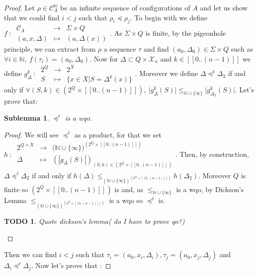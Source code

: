 \documentclass[a4paper,10pt]{report}
\newtheorem{slm}{Sublemma}[lm]
\newtheorem{td}{TODO}
\newcommand{\dmap}[5]{
#1~:~\begin{array}{ccccc}
#2 &\to& #3 \\
#4  &\mapsto& #5
\end{array}}
\newcommand{\seg}[1]{[\![#1]\!]}
\newcommand{\ts}{\seg{0 .. (n-1)}}
\newcommand{\C}{\mathcal{C}_{A}}
\newcommand{\X}{\mathcal{X}_{n}}
\begin{document}
\begin {proof}
Let $\rho \in \C^{\mathbb N}$ be an infinite sequence of configurations of $A$ and let us show that we could find $i < j$ such that $\rho_i \preceq \rho_j$.
To begin with we define
$\dmap{f}{\C}{\Sigma \times Q}{(a,x,\Delta)}{(a,\Delta(x))}$.
As $\Sigma \times Q$ is finite, by the pigeonhole principle, we can extract from $\rho$ a sequence $\tau$ and find $(a_0,\Delta_0) \in \Sigma \times Q$ such as 
$\forall i \in \mathbb N,\ f(\tau_i)=(a_0,\Delta_0)$.
Now for $\Delta \subset Q \times \X $ and $k \in \ts$ we define $\dmap{g^k_\Delta}{2^Q}{2^X}{S}{\{ x \in X | S=\Delta^k(x) \}} .$
Moreover we define $\Delta \preceq^t \Delta_2$ if and only if $\forall (S,k) \in (2^Q \times \ts) ,\ \lvert g^k_\Delta(S) \lvert \leq_{\mathbb N \cup \{\infty\}} \lvert g^k_{\Delta_2}(S) \lvert$. Let's prove that: 
\begin{slm}
  $\preceq^t$ is a wqo.
\end{slm}
\begin{proof}
We will see $\preceq^t$ as a product, for that we set $ \dmap{h}{2^{Q\times X}}{({\mathbb N \cup \{\infty\})}^{(2^Q \times \ts)}}{\Delta}{(|g_{\Delta}(S)|)_{(S,k)\in (2^Q \times \ts)  }}.$
Then, by construction, $\Delta \preceq^t \Delta_2$ if and only if $ h(\Delta) \leq_{{(\mathbb N \cup \{\infty\})}^{(2^Q \times \ts)}} h(\Delta_2)$.
Moreover $Q$ is finite so $(2^Q \times \ts)$ is and, as $\leq_{\mathbb N \cup \{\infty\}}$ is a wqo, by Dickson's Lemma $\leq_{{(\mathbb N \cup \{\infty\})}^{(2^Q \times \ts)}}$
is a wqo so $\preceq^t$ is.
\begin{td}
  Quote dickson's lemma( do I have to prove qo?) 
\end{td}
\end{proof}
Then we can find $i < j$ such that $\tau_i=(a_0,x_i,\Delta_i), \tau_j=(a_0,x_j,\Delta_j)$ and $\Delta_i \preceq^t \Delta_j$.
Now let's prove that :


\end{proof}
\end{document}
